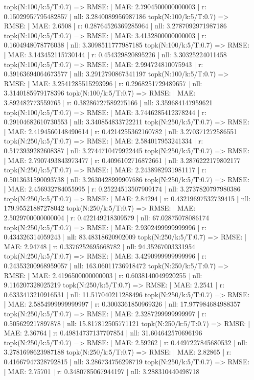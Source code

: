 topk(N:100/k:5/T:0.7) => RMSE: | MAE: 2.7904500000000003 | r: 0.15029957795482857 | nll: 3.2840089956987186
topk(N:100/k:5/T:0.7) => RMSE: | MAE: 2.6508 | r: 0.28764526369285964 | nll: 3.2787092971987186
topk(N:100/k:5/T:0.7) => RMSE: | MAE: 3.4132800000000003 | r: 0.1604948078776038 | nll: 3.3098511777987185
topk(N:100/k:5/T:0.7) => RMSE: | MAE: 3.143452115730144 | r: 0.454329820895226 | nll: 3.30325224011458
topk(N:100/k:5/T:0.7) => RMSE: | MAE: 2.994724810075943 | r: 0.39163694064673577 | nll: 3.2912790867341197
topk(N:100/k:5/T:0.7) => RMSE: | MAE: 3.2541285515293996 | r: 0.2968251729489657 | nll: 3.3140185979178396
topk(N:100/k:5/T:0.7) => RMSE: | MAE: 3.892482773559765 | r: 0.38286727589275166 | nll: 3.359684147959621
topk(N:100/k:5/T:0.7) => RMSE: | MAE: 3.7446285412378244 | r: 0.29104682610730553 | nll: 3.340854833722211
topk(N:250/k:5/T:0.7) => RMSE: | MAE: 2.4194560148490614 | r: 0.4214255362160782 | nll: 3.270371272586551
topk(N:250/k:5/T:0.7) => RMSE: | MAE: 2.584017953241334 | r: 0.5173939282608387 | nll: 3.2744710479922445
topk(N:250/k:5/T:0.7) => RMSE: | MAE: 2.7907493843973477 | r: 0.4096102716872661 | nll: 3.2876222179802177
topk(N:250/k:5/T:0.7) => RMSE: | MAE: 2.2438982931981117 | r: 0.5013631590093738 | nll: 3.2630428999907686
topk(N:250/k:5/T:0.7) => RMSE: | MAE: 2.456932784055995 | r: 0.25224513507909174 | nll: 3.2737820797980386
topk(N:250/k:5/T:0.7) => RMSE: | MAE: 2.84294 | r: 0.43219697532739415 | nll: 179.95521887278042
topk(N:250/k:5/T:0.7) => RMSE: | MAE: 2.5029700000000004 | r: 0.422149218309579 | nll: 67.02875078086174
topk(N:250/k:5/T:0.7) => RMSE: | MAE: 2.9302499999999996 | r: 0.434326314059243 | nll: 83.48318620902009
topk(N:250/k:5/T:0.7) => RMSE: | MAE: 2.94748 | r: 0.3376252695668782 | nll: 94.35267003331954
topk(N:250/k:5/T:0.7) => RMSE: | MAE: 3.4290999999999996 | r: 0.24353200968959057 | nll: 163.06011736918472
topk(N:250/k:5/T:0.7) => RMSE: | MAE: 2.4196500000000003 | r: 0.6038140049920255 | nll: 9.116207328025219
topk(N:250/k:5/T:0.7) => RMSE: | MAE: 2.2541 | r: 0.6333413210916531 | nll: 11.517040211288496
topk(N:250/k:5/T:0.7) => RMSE: | MAE: 2.5854999999999997 | r: 0.3003361850969326 | nll: 17.977984684988357
topk(N:250/k:5/T:0.7) => RMSE: | MAE: 2.3287299999999997 | r: 0.505629217897878 | nll: 15.817812505771121
topk(N:250/k:5/T:0.7) => RMSE: | MAE: 2.36764 | r: 0.49814737137707854 | nll: 31.604642570696196
topk(N:250/k:5/T:0.7) => RMSE: | MAE: 2.59262 | r: 0.4497227845680532 | nll: 3.2781698623987188
topk(N:250/k:5/T:0.7) => RMSE: | MAE: 2.82865 | r: 0.41667947328792815 | nll: 3.286734756298719
topk(N:250/k:5/T:0.7) => RMSE: | MAE: 2.75701 | r: 0.3480785067944197 | nll: 3.288310440498718
